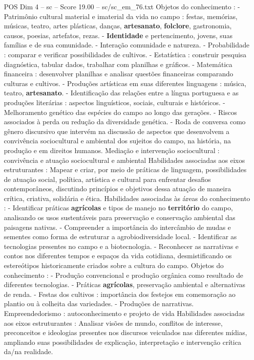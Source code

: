 \begin{textsample}{POS Dim 4 – sc – Score 19.00 – sc/sc\_em\_76.txt}
Objetos do conhecimento : - Patrimônio cultural material e imaterial da vida no campo : festas, memórias, músicas, teatro, artes plásticas, danças, \textbf{artesanato}, \textbf{folclore}, gastronomia, causos, poesias, artefatos, rezas. - \textbf{Identidade} e pertencimento, jovens, suas famílias e de sua comunidade. - Interação comunidade e natureza. - Probabilidade : comparar e verificar possibilidades de cultivos. - Estatística : construir pesquisa diagnóstica, tabular dados, trabalhar com planilhas e gráficos. - Matemática financeira : desenvolver planilhas e analisar questões financeiras comparando culturas e cultivos. - Produções artísticas em suas diferentes linguagens : música, teatro, \textbf{artesanato}. - Identificação das relações entre a língua portuguesa e as produções literárias : aspectos linguísticos, sociais, culturais e históricos. - Melhoramento genético das espécies do campo ao longo das gerações. - Riscos associados à perda ou redução da diversidade genética. - Roda de conversa como gênero discursivo que intervém na discussão de aspectos que desenvolvem a convivência sociocultural e ambiental dos sujeitos do campo, na história, na produção e em direitos humanos.
Mediação e intervenção sociocultural : convivência e atuação sociocultural e ambiental Habilidades associadas aos eixos estruturantes : Mapear e criar, por meio de práticas de linguagem, possibilidades de atuação social, política, artística e cultural para enfrentar desafios contemporâneos, discutindo princípios e objetivos dessa atuação de maneira crítica, criativa, solidária e ética.
Habilidades associadas às áreas do conhecimento : - Identificar práticas \textbf{agrícolas} e tipos de manejo no \textbf{território} do campo, analisando os usos sustentáveis para preservação e conservação ambiental das paisagens nativas. - Compreender a importância do intercâmbio de mudas e sementes como forma de estruturar a agrobiodiversidade local. - Identificar as tecnologias presentes no campo e a biotecnologia. - Reconhecer as narrativas e contos nos diferentes tempos e espaços da vida cotidiana, desmistificando os estereótipos historicamente criados sobre a cultura do campo.
Objetos do conhecimento : - Produção convencional e produção orgânica como resultado de diferentes tecnologias. - Práticas \textbf{agrícolas}, preservação ambiental e alternativas de renda. - Festas dos cultivos : importância dos festejos em comemoração ao plantio ou à colheita das variedades. - Produções de narrativas.
Empreendedorismo : autoconhecimento e projeto de vida Habilidades associadas aos eixos estruturantes : Analisar visões de mundo, conflitos de interesse, preconceitos e ideologias presentes nos discursos veiculados nas diferentes mídias, ampliando suas possibilidades de explicação, interpretação e intervenção crítica da/na realidade.

\end{textsample}
